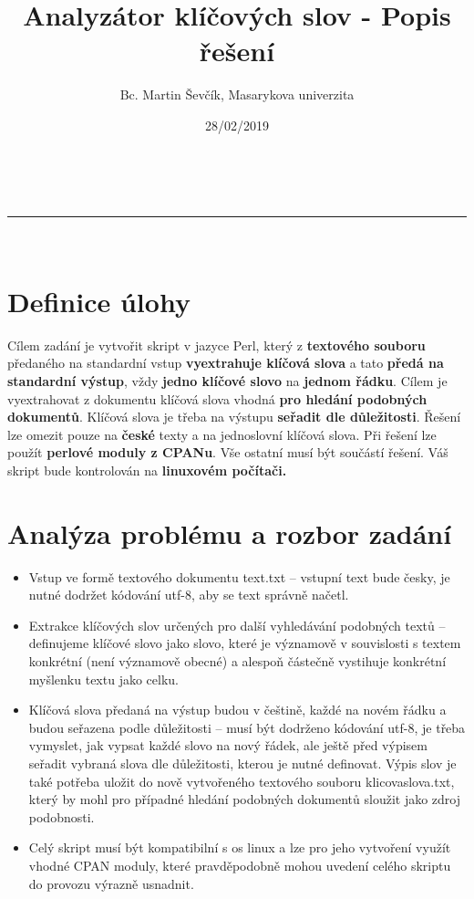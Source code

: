 \documentclass[a4paper,11pt]{article}
\makeatletter
\newcommand{\linia}{\rule{\linewidth}{0.5pt}}
\theoremstyle{mytheor}
\renewcommand{\maketitle}{
\begin{center}
\vspace{2ex}
{\huge \textsc{\@title}}
\vspace{1ex}
\\
\linia\\
\@author \hfill \@date
\vspace{4ex}
\end{center}
}
\makeatother
\begin{document}
\title{Analyzátor klíčových slov - Popis řešení}

\author{Bc. Martin Ševčík, Masarykova univerzita}

\date{28/02/2019}

\maketitle

\section*{Definice úlohy}

Cílem zadání je vytvořit skript v jazyce Perl, který z
\textbf{textového souboru} předaného na standardní vstup
\textbf{vyextrahuje klíčová slova} a tato \textbf{předá na
standardní výstup}, vždy \textbf{jedno klíčové slovo} na
\textbf{jednom řádku}. Cílem je vyextrahovat z dokumentu klíčová
slova vhodná \textbf{pro hledání podobných dokumentů}. Klíčová slova
je třeba na výstupu \textbf{seřadit dle důležitosti}. Řešení lze
omezit pouze na \textbf{české} texty a na jednoslovní klíčová slova.
Při řešení lze použít \textbf{perlové moduly z CPANu}. Vše ostatní
musí být součástí řešení. Váš skript bude kontrolován na
\textbf{linuxovém počítači.}

\section*{Analýza problému a rozbor zadání}

\begin{itemize}
\item Vstup ve formě textového dokumentu text.txt – vstupní text
bude česky, je nutné dodržet kódování utf-8, aby se text správně
načetl.
\item Extrakce klíčových slov určených pro další vyhledávání
podobných textů – definujeme klíčové slovo jako slovo, které je
významově v souvislosti s textem konkrétní (není významově obecné) a
alespoň částečně vystihuje konkrétní myšlenku textu jako celku.
\item Klíčová slova předaná na výstup budou v češtině, každé na
novém řádku a budou seřazena podle důležitosti – musí být dodrženo
kódování utf-8, je třeba vymyslet, jak vypsat každé slovo na nový
řádek, ale ještě před výpisem seřadit vybraná slova dle důležitosti,
kterou je nutné definovat. Výpis slov je také potřeba uložit do nově
vytvořeného textového souboru klicovaslova.txt, který by mohl pro
případné hledání podobných dokumentů sloužit jako zdroj podobnosti.
\item Celý skript musí být kompatibilní s os linux a lze pro jeho
vytvoření využít vhodné CPAN moduly, které pravděpodobně mohou
uvedení celého skriptu do provozu výrazně usnadnit.
\end{itemize}
\end{document}
